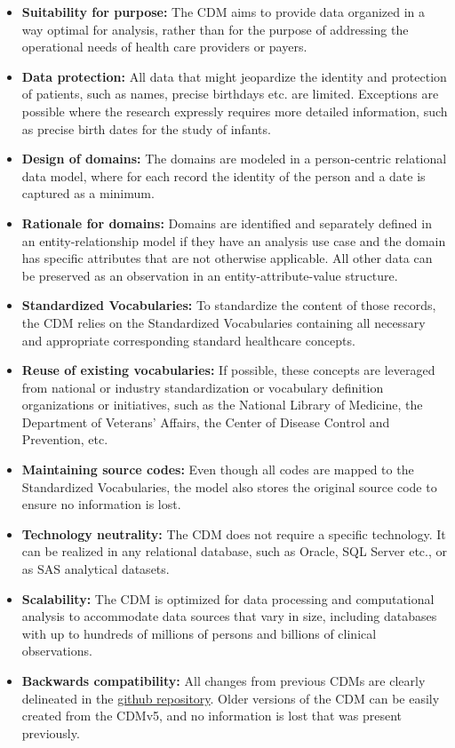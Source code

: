 \documentclass[]{book}
\providecommand{\tightlist}{%
  \setlength{\itemsep}{0pt}\setlength{\parskip}{0pt}}
\begin{document}
\begin{itemize}
\tightlist
\item
  \textbf{Suitability for purpose:} The CDM aims to provide data
  organized in a way optimal for analysis, rather than for the purpose
  of addressing the operational needs of health care providers or
  payers.
\item
  \textbf{Data protection:} All data that might jeopardize the identity
  and protection of patients, such as names, precise birthdays etc. are
  limited. Exceptions are possible where the research expressly requires
  more detailed information, such as precise birth dates for the study
  of infants.
\item
  \textbf{Design of domains:} The domains are modeled in a
  person-centric relational data model, where for each record the
  identity of the person and a date is captured as a minimum.
\item
  \textbf{Rationale for domains:} Domains are identified and separately
  defined in an entity-relationship model if they have an analysis use
  case and the domain has specific attributes that are not otherwise
  applicable. All other data can be preserved as an observation in an
  entity-attribute-value structure.
\item
  \textbf{Standardized Vocabularies:} To standardize the content of
  those records, the CDM relies on the Standardized Vocabularies
  containing all necessary and appropriate corresponding standard
  healthcare concepts.
\item
  \textbf{Reuse of existing vocabularies:} If possible, these concepts
  are leveraged from national or industry standardization or vocabulary
  definition organizations or initiatives, such as the National Library
  of Medicine, the Department of Veterans' Affairs, the Center of
  Disease Control and Prevention, etc.
\item
  \textbf{Maintaining source codes:} Even though all codes are mapped to
  the Standardized Vocabularies, the model also stores the original
  source code to ensure no information is lost.
\item
  \textbf{Technology neutrality:} The CDM does not require a specific
  technology. It can be realized in any relational database, such as
  Oracle, SQL Server etc., or as SAS analytical datasets.
\item
  \textbf{Scalability:} The CDM is optimized for data processing and
  computational analysis to accommodate data sources that vary in size,
  including databases with up to hundreds of millions of persons and
  billions of clinical observations.
\item
  \textbf{Backwards compatibility:} All changes from previous CDMs are
  clearly delineated in the
  \href{https://github.com/OHDSI/CommonDataModel}{github repository}.
  Older versions of the CDM can be easily created from the CDMv5, and no
  information is lost that was present previously.
\end{itemize}
\end{document}

